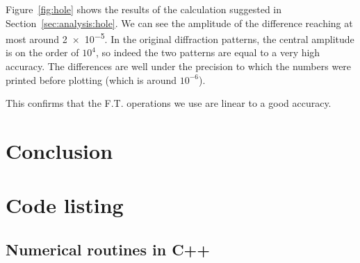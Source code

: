\documentclass[11pt]{article}
\begin{document}
Figure~\ref{fig:hole} shows the results of the calculation suggested in Section~\ref{sec:analysis:hole}. We can see the amplitude of the difference reaching at most around \num{2e-5}. In the original diffraction patterns, the central amplitude is on the order of $10^4$, so indeed the two patterns are equal to a very high accuracy. The differences are well under the precision to which the numbers were printed before plotting (which is around $10^{-6}$).

This confirms that the F.T. operations we use are linear to a good accuracy.

\section{Conclusion}\label{sec:conclusion}

\printbibliography{}
\pagebreak

\appendix
\section{Code listing}
\subsection{Numerical routines in C++}





\end{document}
